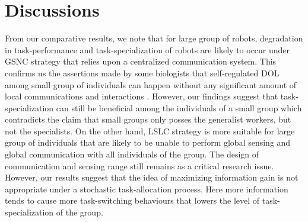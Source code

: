 \documentclass[journal]{IEEEtran}
\begin{document}
\section{Discussions}
\label{sec:discuss}
\vspace*{-0.2cm}
From our comparative results, we note that for large group of robots,  degradation in  task-performance and task-specialization of robots are likely to occur  under GSNC strategy that relies upon a centralized communication system. This confirms us the assertions made by some biologists that self-regulated DOL among small group of individuals can happen without any significant amount of local communications and interactions \cite{Garnier+2007}. However, our findings suggest that task-specialization can still be beneficial among the individuals of a small group which contradicts the claim that small groups only posses the generalist workers, but not the specialists.
On the other hand, LSLC strategy is more suitable for large group of individuals that are likely to be unable to perform global sensing and global communication with all individuals of the group. The design of communication and sensing range still remains as a critical research issue. However, our results suggest that the idea of maximizing information gain is not appropriate under a stochastic task-allocation process. Here more information tends to cause more task-switching behaviours that lowers the level of task-specialization of the group. %
\end{document}

